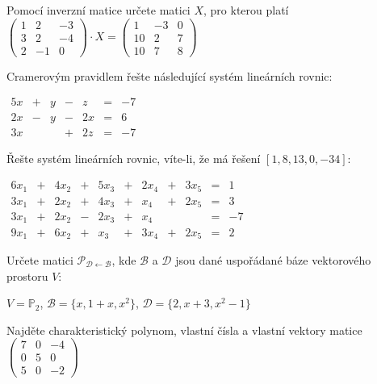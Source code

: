\begin{questions}

\question Pomocí inverzní matice určete matici \(X\), pro kterou platí
\(
    \begin{pmatrix}
        1 & 2 & -3\\
        3 & 2 & -4\\
        2 & -1 & 0
    \end{pmatrix}
    \cdot X =
    \begin{pmatrix}
        1 & -3 & 0\\
        10 & 2 & 7\\
        10 & 7 & 8
    \end{pmatrix}
\)

\question Cramerovým pravidlem řešte následující systém lineárních rovnic:
\begin{center}
    \(\begin{matrix}
        5x & + & y & - & z  & = & -7\\
        2x & - & y & - & 2x & = & 6\\
        3x &   &   & + & 2z & = & -7
    \end{matrix}\)
\end{center}

\newpage

\question Řešte systém lineárních rovnic, víte-li, že má řešení \([1, 8, 13, 0, -34]\):

\begin{center}
    \(\begin{matrix}
        6x_1 & + & 4x_2 & + & 5x_3 & + & 2x_4 & + & 3x_5 & = & 1 \\
        3x_1 & + & 2x_2 & + & 4x_3 & + & x_4  & + & 2x_5 & = & 3 \\
        3x_1 & + & 2x_2 & - & 2x_3 & + & x_4  &   &      & = & -7\\
        9x_1 & + & 6x_2 & + & x_3  & + & 3x_4 & + & 2x_5 & = & 2
    \end{matrix}\)
\end{center}

\question Určete matici \(\mathcal{P}_{\mathcal{D} \leftarrow \mathcal{B}}\), kde \(\mathcal{B}\) a \(\mathcal{D}\) jsou dané uspořádané báze vektorového prostoru \(V\):

\begin{center}
    \(V = \mathbb{P}_2\), \(\mathcal{B} = \{ x, 1+x, x^2 \}\), \(\mathcal{D} = \{ 2, x+3, x^2-1 \}\)
\end{center}


\newpage
\question Najděte charakteristický polynom, vlastní čísla a vlastní vektory matice \(\begin{pmatrix}
    7 & 0 & -4\\
    0 & 5 & 0\\
    5 & 0 & -2
\end{pmatrix}\)
\end{questions}
